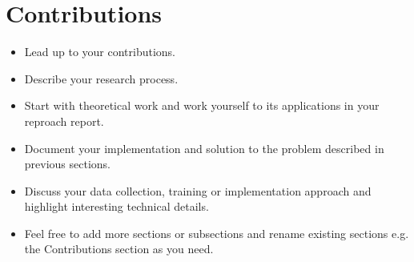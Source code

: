 \section{Contributions}

\begin{itemize}
	\item Lead up to your contributions.
	\item Describe your research process.
	\item Start with theoretical work and work yourself to its applications in your reproach report.
	\item Document your implementation and solution to the problem described in previous sections.
	\item Discuss your data collection, training or implementation approach and highlight interesting technical details.
	\item Feel free to add more sections or subsections and rename existing sections e.g. the Contributions section as you need.
\end{itemize}
